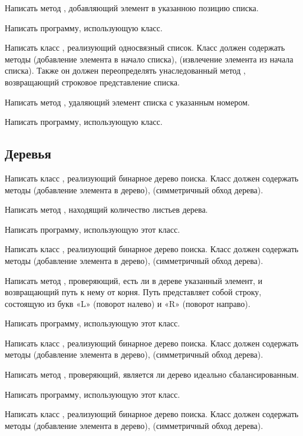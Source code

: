Написать метод , добавляющий элемент в указанною позицию
списка.

Написать программу, использующую класс.

\task Написать класс , реализующий односвязный
список. Класс должен содержать методы  (добавление элемента
в начало списка),  (извлечение элемента из начала
списка). Также он должен переопределять унаследованный метод
, возвращающий строковое представление списка.

Написать метод , удаляющий элемент списка с указанным
номером.

Написать программу, использующую класс.


\subsection{Деревья}

\task Написать класс , реализующий бинарное дерево
поиска. Класс должен содержать методы  (добавление элемента в
дерево),  (симметричный обход дерева).

Написать метод , находящий количество листьев дерева.

Написать программу, использующую этот класс.

\task Написать класс , реализующий бинарное дерево
поиска. Класс должен содержать методы  (добавление элемента в
дерево),  (симметричный обход дерева).

Написать метод , проверяющий, есть ли в дереве указанный
элемент, и возвращающий путь к нему от корня. Путь представляет собой
строку, состоящую из букв «L» (поворот налево) и «R» (поворот
направо).

Написать программу, использующую этот класс.

\task Написать класс , реализующий бинарное дерево
поиска. Класс должен содержать методы  (добавление элемента в
дерево),  (симметричный обход дерева).

Написать метод , проверяющий, является ли дерево
идеально сбалансированным.

Написать программу, использующую этот класс.

\task Написать класс , реализующий бинарное дерево
поиска. Класс должен содержать методы  (добавление элемента в
дерево),  (симметричный обход дерева).

